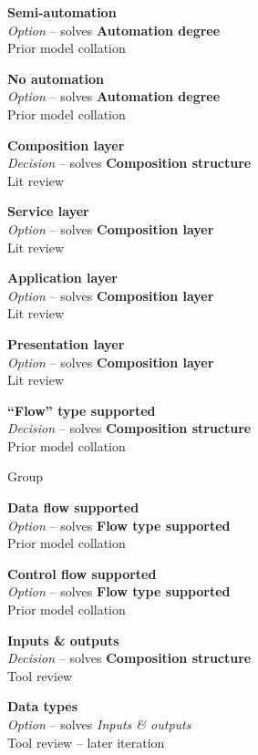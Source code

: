 \textbf{Semi-automation} \\ \emph{Option} -- solves \textbf{Automation degree} \\ Prior model collation \cite{Aghaee2012,Fischer2009}

\textbf{No automation} \\ \emph{Option} -- solves \textbf{Automation degree} \\ Prior model collation \cite{Fischer2009}

\textbf{Composition layer} \\ \emph{Decision} -- solves \textbf{Composition structure} \\ Lit review \cite{Paterno2011}

\textbf{Service layer} \\ \emph{Option} -- solves \textbf{Composition layer} \\ Lit review \cite{Paterno2011}

\textbf{Application layer} \\ \emph{Option} -- solves \textbf{Composition layer} \\ Lit review \cite{Paterno2011}

\textbf{Presentation layer} \\ \emph{Option} -- solves \textbf{Composition layer} \\ Lit review \cite{Paterno2011}

\textbf{``Flow'' type supported} \\ \emph{Decision} -- solves \textbf{Composition structure} \\ Prior model collation

Group

\textbf{Data flow supported} \\ \emph{Option} -- solves \textbf{Flow type supported} \\ Prior model collation \cite{Grammel2010,Pietschmann2010}

\textbf{Control flow supported} \\ \emph{Option} -- solves \textbf{Flow type supported} \\ Prior model collation \cite{Grammel2010,Pietschmann2010}

\textbf{Inputs \& outputs} \\ \emph{Decision} -- solves \textbf{Composition structure} \\ Tool review

\textbf{Data types} \\ \emph{Option} -- solves \emph{Inputs \& outputs} \\ Tool review  -- later iteration

